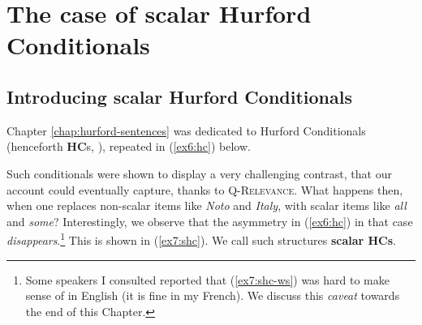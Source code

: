 %


\section{The case of scalar Hurford Conditionals}\label{sec7:shc}

\subsection{Introducing scalar Hurford Conditionals}

Chapter \ref{chap:hurford-sentences} was dedicated to Hurford Conditionals (henceforth \textbf{HC}s, \parencite{Mandelkern2018}), repeated in (\ref{ex6:hc}) below.

\begin{exe}
	\begin{xlist}
	\end{xlist}
\end{exe}

Such conditionals were shown to display a very challenging contrast, that our account could eventually capture, thanks to \textsc{Q-Relevance}. What happens then, when one replaces non-scalar items like \textit{Noto} and \textit{Italy}, with scalar items like \textit{all} and \textit{some}? 
Interestingly, we observe that the asymmetry in (\ref{ex6:hc}) in that case \textit{disappears}.\footnote{Some speakers I consulted reported that (\ref{ex7:shc-ws}) was hard to make sense of in English (it is fine in my French). We discuss this \textit{caveat} towards the end of this Chapter.} This is shown in (\ref{ex7:shc}). We call such structures \textbf{scalar HCs}.

